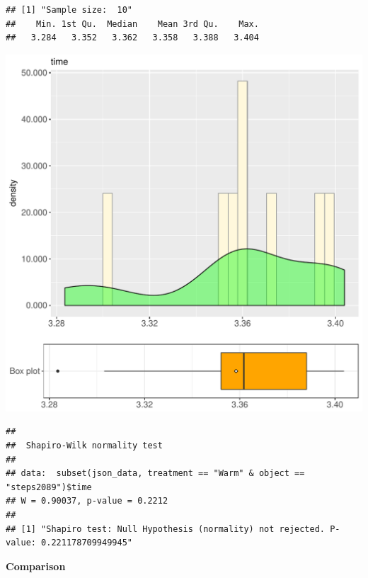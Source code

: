 \documentclass{article}\usepackage[]{graphicx}\usepackage[]{color}
\makeatletter
\def\maxwidth{ %
  \ifdim\Gin@nat@width>\linewidth
    \linewidth
  \else
    \Gin@nat@width
  \fi
}
\newenvironment{kframe}{%
 \def\at@end@of@kframe{}%
 \ifinner\ifhmode%
  \def\at@end@of@kframe{\end{minipage}}%
  \begin{minipage}{\columnwidth}%
 \fi\fi%
 \def\FrameCommand##1{\hskip\@totalleftmargin \hskip-\fboxsep
 \colorbox{shadecolor}{##1}\hskip-\fboxsep
     \hskip-\linewidth \hskip-\@totalleftmargin \hskip\columnwidth}%
 \MakeFramed {\advance\hsize-\width
   \@totalleftmargin\z@ \linewidth\hsize
   \@setminipage}}%
 {\par\unskip\endMakeFramed%
 \at@end@of@kframe}
\newenvironment{knitrout}{}{} %
\makeatother
\begin{document}
\begin{knitrout}
\color{fgcolor}\begin{kframe}
\begin{verbatim}
## [1] "Sample size:  10"
##    Min. 1st Qu.  Median    Mean 3rd Qu.    Max. 
##   3.284   3.352   3.362   3.358   3.388   3.404
\end{verbatim}
\end{kframe}
\includegraphics[width=\maxwidth]{figure/RH1_Warm_steps2089-1} 
\begin{kframe}\begin{verbatim}
## 
## 	Shapiro-Wilk normality test
## 
## data:  subset(json_data, treatment == "Warm" & object == "steps2089")$time
## W = 0.90037, p-value = 0.2212
## 
## [1] "Shapiro test: Null Hypothesis (normality) not rejected. P-value: 0.221178709949945"
\end{verbatim}
\end{kframe}
\end{knitrout}
  
 \textbf{Comparison}
  
\end{document}
